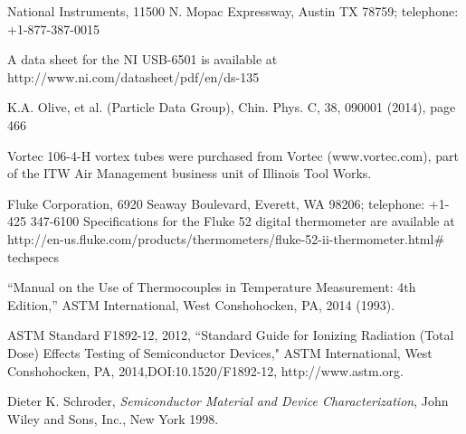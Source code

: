 National Instruments, 11500 N. Mopac Expressway, Austin TX 78759; telephone: +1-877-387-0015

A data sheet for the NI USB-6501 is available at
http://www.ni.com/datasheet/pdf/en/ds-135

K.A. Olive, et al. (Particle Data Group), Chin. Phys. C, 38, 090001 (2014), page 466

Vortec 106-4-H vortex tubes were purchased from Vortec (www.vortec.com), part of the ITW Air Management business unit of Illinois Tool Works.

Fluke Corporation, 6920 Seaway Boulevard, Everett, WA 98206; telephone: +1-425 347-6100
Specifications for the Fluke 52 digital thermometer are available at http://en-us.fluke.com/products/thermometers/fluke-52-ii-thermometer.html$\#$techspecs

``Manual on the Use of Thermocouples in Temperature Measurement: 4th Edition,'' ASTM International, West Conshohocken, PA, 2014 (1993).

ASTM Standard F1892-12, 2012, ``Standard Guide for Ionizing Radiation (Total Dose) Effects Testing of Semiconductor Devices," ASTM International, West Conshohocken, PA, 2014,DOI:10.1520/F1892-12, http://www.astm.org.

Dieter K. Schroder, \emph{Semiconductor Material and Device Characterization},
John Wiley and Sons, Inc., New York 1998.


